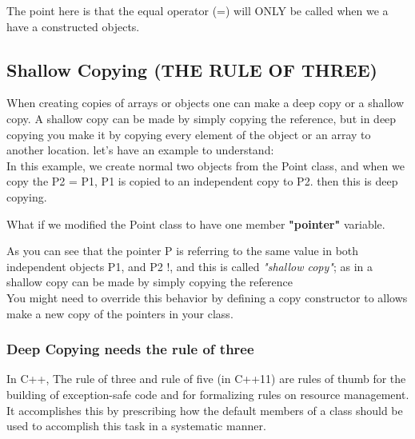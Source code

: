 \documentclass{article}
\begin{document}


The point here is that the equal operator (=) will ONLY be called when we a have a constructed objects.

\subsection{Shallow Copying (THE RULE OF THREE)}
\label{shallow_copy}
When creating copies of arrays or objects one can make a deep copy or a shallow copy. A shallow copy can be made by simply copying the reference, but in deep copying you make it by copying every element of the object or an array to another location. let's have an example to understand:\\
In this example, we create normal two objects from the Point class, and when we copy the P2 = P1, P1 is copied to an independent copy to P2. then this is deep copying.


What if we modified the Point class to have one member \textbf{"pointer"} variable.


As you can see that the pointer P is referring to the same value in both independent objects P1, and P2 !, and this is called \textit{"shallow copy"}; as in a shallow copy can be made by simply copying the reference\\
You might need to override this behavior by defining a copy constructor to allows make a new copy of the pointers in your class.



\subsubsection{Deep Copying needs the rule of three}
In C++, The rule of three and rule of five (in C++11) are rules of thumb for the building of exception-safe code and for formalizing rules on resource management. It accomplishes this by prescribing how the default members of a class should be used to accomplish this task in a systematic manner.\\
\end{document}
